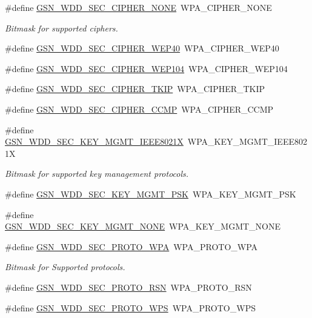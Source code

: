 \begin{DoxyCompactItemize}
\item 
\#define \hyperlink{a00604_ad56583332743d373461e38f481a6a417}{GSN\_\-WDD\_\-SEC\_\-CIPHER\_\-NONE}~WPA\_\-CIPHER\_\-NONE
\begin{DoxyCompactList}\small\item\em Bitmask for supported ciphers. \end{DoxyCompactList}\item 
\#define \hyperlink{a00604_ad934eadbb32639568234455fb01545b5}{GSN\_\-WDD\_\-SEC\_\-CIPHER\_\-WEP40}~WPA\_\-CIPHER\_\-WEP40
\item 
\#define \hyperlink{a00604_a75410ead00825fdb1501f9559cb0e96f}{GSN\_\-WDD\_\-SEC\_\-CIPHER\_\-WEP104}~WPA\_\-CIPHER\_\-WEP104
\item 
\#define \hyperlink{a00604_a48db4b5683dca1d4d74573b6cd1a1380}{GSN\_\-WDD\_\-SEC\_\-CIPHER\_\-TKIP}~WPA\_\-CIPHER\_\-TKIP
\item 
\#define \hyperlink{a00604_a05b7168f2cc6e831dd8855633e4741c3}{GSN\_\-WDD\_\-SEC\_\-CIPHER\_\-CCMP}~WPA\_\-CIPHER\_\-CCMP
\item 
\#define \hyperlink{a00604_a1abb34c938af83c33fb62cb19d7aca8b}{GSN\_\-WDD\_\-SEC\_\-KEY\_\-MGMT\_\-IEEE8021X}~WPA\_\-KEY\_\-MGMT\_\-IEEE8021X
\begin{DoxyCompactList}\small\item\em Bitmask for supported key management protocols. \end{DoxyCompactList}\item 
\#define \hyperlink{a00604_a448137180afc88b52d94479e7c40b08a}{GSN\_\-WDD\_\-SEC\_\-KEY\_\-MGMT\_\-PSK}~WPA\_\-KEY\_\-MGMT\_\-PSK
\item 
\#define \hyperlink{a00604_a0043f53b892145ca8db0bf60faa9e0a4}{GSN\_\-WDD\_\-SEC\_\-KEY\_\-MGMT\_\-NONE}~WPA\_\-KEY\_\-MGMT\_\-NONE
\item 
\#define \hyperlink{a00604_abf0fb4b161dfe7d73925179a0e056b66}{GSN\_\-WDD\_\-SEC\_\-PROTO\_\-WPA}~WPA\_\-PROTO\_\-WPA
\begin{DoxyCompactList}\small\item\em Bitmask for Supported protocols. \end{DoxyCompactList}\item 
\#define \hyperlink{a00604_a623ba5d123546d9c09c0e8297656ee6d}{GSN\_\-WDD\_\-SEC\_\-PROTO\_\-RSN}~WPA\_\-PROTO\_\-RSN
\item 
\#define \hyperlink{a00604_a7b2c83606d076c8c709d84768c8dc4a9}{GSN\_\-WDD\_\-SEC\_\-PROTO\_\-WPS}~WPA\_\-PROTO\_\-WPS
\item 

\end{DoxyCompactItemize}
